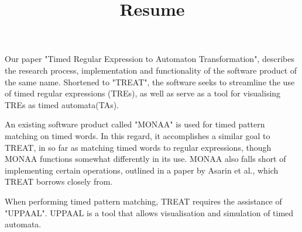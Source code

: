 \documentclass{article}
\begin{document}
\title{Resume}

Our paper "Timed Regular Expression to Automaton Transformation", describes the research process, implementation and functionality of the software product of the same name.
Shortened to "TREAT", the software seeks to streamline the use of timed regular expressions (TREs), as well as serve as a tool for visualising TREs as timed automata(TAs).

An existing software product called "MONAA" is used for timed pattern matching on timed words. In this regard, it accomplishes a similar goal to TREAT, in so far as matching timed words to regular expressions, though MONAA functions somewhat differently in its use.
MONAA also falls short of implementing certain operations, outlined in a paper by Asarin et al., which TREAT borrows closely from.

When performing timed pattern matching, TREAT requires the assistance of "UPPAAL". UPPAAL is a tool that allows visualisation and simulation of timed automata. 
\end{document}
